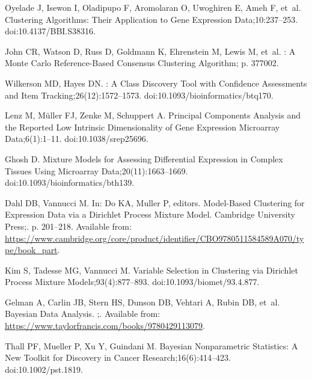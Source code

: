 \documentclass[10pt,letterpaper]{article}
\begin{document}
\begin{thebibliography}{10}
	Oyelade J, Isewon I, Oladipupo F, Aromolaran O, Uwoghiren E, Ameh F, et~al.
	\newblock Clustering {{Algorithms}}: {{Their Application}} to {{Gene Expression
			Data}};10:237--253.
	\newblock doi:{10.4137/BBI.S38316}.
	
	John CR, Watson D, Russ D, Goldmann K, Ehrenstein M, Lewis M, et~al.
	: {{A Monte Carlo}} Reference-Based Consensus Clustering
	Algorithm; p. 377002.
	
	Wilkerson MD, Hayes DN.
	: A Class Discovery Tool with Confidence
	Assessments and Item Tracking;26(12):1572--1573.
	\newblock doi:{10.1093/bioinformatics/btq170}.
	
	Lenz M, Müller FJ, Zenke M, Schuppert A.
	\newblock Principal Components Analysis and the Reported Low Intrinsic
	Dimensionality of Gene Expression Microarray Data;6(1):1--11.
	\newblock doi:{10.1038/srep25696}.
	
	Ghosh D.
	\newblock Mixture Models for Assessing Differential Expression in Complex
	Tissues Using Microarray Data;20(11):1663--1669.
	\newblock doi:{10.1093/bioinformatics/bth139}.
	
	Dahl DB, Vannucci M.
	\newblock In: Do KA, Muller P, editors. Model-{{Based Clustering}} for
	{{Expression Data}} via a {{Dirichlet Process Mixture Model}}. {Cambridge
		University Press};. p. 201--218.
	\newblock Available from:
	\url{https://www.cambridge.org/core/product/identifier/CBO9780511584589A070/type/book_part}.
	
	Kim S, Tadesse MG, Vannucci M.
	\newblock Variable Selection in Clustering via {{Dirichlet}} Process Mixture
	Models;93(4):877--893.
	\newblock doi:{10.1093/biomet/93.4.877}.
	
	Gelman A, Carlin JB, Stern HS, Dunson DB, Vehtari A, Rubin DB, et~al.
	\newblock Bayesian {{Data Analysis}}.
	;.
	\newblock Available from:
	\url{https://www.taylorfrancis.com/books/9780429113079}.
	
	Thall PF, Mueller P, Xu Y, Guindani M.
	\newblock Bayesian Nonparametric Statistics: {{A}} New Toolkit for Discovery in
	Cancer Research;16(6):414--423.
	\newblock doi:{10.1002/pst.1819}.
	

\end{thebibliography}
\end{document}
